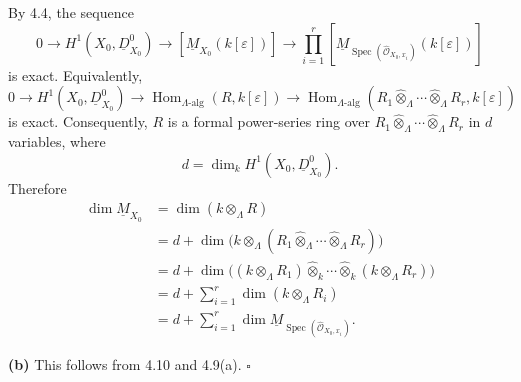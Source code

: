 By 4.4, the sequence
\[
0\longrightarrow H^1(X_0,\underline D^0_{X_0})
\longrightarrow[\underline M_{X_0}(k[\varepsilon])]
\longrightarrow
\prod_{i=1}^r
[\underline M_{\operatorname{Spec}(\widehat{\mathcal O}_{X_0,x_i})}
  (k[\varepsilon])]
\]
is exact. Equivalently,
\[
0\longrightarrow H^1(X_0,\underline D^0_{X_0})
\longrightarrow\operatorname{Hom}_{\Lambda\text{-alg}}(R,k[\varepsilon])
\longrightarrow
\operatorname{Hom}_{\Lambda\text{-alg}}
 (R_1\widehat\otimes_\Lambda\cdots\widehat\otimes_\Lambda R_r,
  k[\varepsilon])
\]
is exact. Consequently, $R$ is a formal power-series ring over
$R_1\widehat\otimes_\Lambda\cdots\widehat\otimes_\Lambda R_r$ in
$d$ variables, where
\[
d=\dim_k H^1(X_0,\underline D^0_{X_0}).
\]
Therefore
\begin{align*}
\dim\underline M_{X_0}
 &=\dim(k\otimes_\Lambda R) \\
 &=d+\dim\bigl(k\otimes_\Lambda
   (R_1\widehat\otimes_\Lambda\cdots\widehat\otimes_\Lambda R_r)
   \bigr) \\
 &=d+\dim\bigl((k\otimes_\Lambda R_1)
   \widehat\otimes_k\cdots\widehat\otimes_k
   (k\otimes_\Lambda R_r)\bigr) \\
 &=d+\sum_{i=1}^r\dim(k\otimes_\Lambda R_i) \\
 &=d+\sum_{i=1}^r
   \dim\underline M_{\operatorname{Spec}
   (\widehat{\mathcal O}_{X_0,x_i})}.
\end{align*}


\noindent\textbf{(b)} This follows from 4.10 and 4.9(a).
\hfill$\square$

